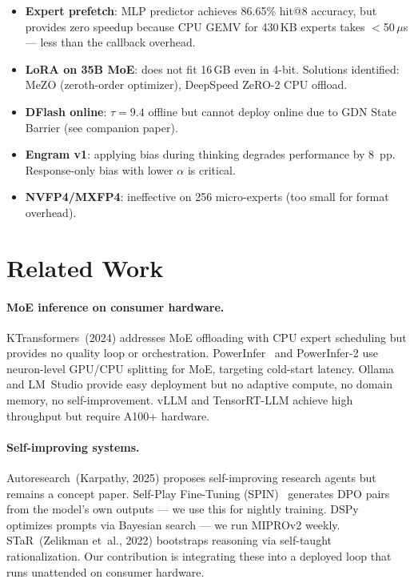 \documentclass[10pt,a4paper]{article}
\begin{document}
\begin{itemize}
  \item \textbf{Expert prefetch}: MLP predictor achieves 86.65\% hit@8 accuracy, but provides zero speedup because CPU GEMV for 430\,KB experts takes $<$50\,$\mu$s --- less than the callback overhead.
  \item \textbf{LoRA on 35B MoE}: does not fit 16\,GB even in 4-bit. Solutions identified: MeZO (zeroth-order optimizer), DeepSpeed ZeRO-2 CPU offload.
  \item \textbf{DFlash online}: $\tau{=}9.4$ offline but cannot deploy online due to GDN State Barrier (see companion paper).
  \item \textbf{Engram v1}: applying bias during thinking degrades performance by 8~pp. Response-only bias with lower $\alpha$ is critical.
  \item \textbf{NVFP4/MXFP4}: ineffective on 256 micro-experts (too small for format overhead).
\end{itemize}

\section{Related Work}

\paragraph{MoE inference on consumer hardware.}
KTransformers~(2024) addresses MoE offloading with CPU expert scheduling but provides no quality loop or orchestration.
PowerInfer~\cite{powerinfer2024} and PowerInfer-2 use neuron-level GPU/CPU splitting for MoE, targeting cold-start latency.
Ollama and LM~Studio provide easy deployment but no adaptive compute, no domain memory, no self-improvement.
vLLM and TensorRT-LLM achieve high throughput but require A100+ hardware.

\paragraph{Self-improving systems.}
Autoresearch~(Karpathy, 2025) proposes self-improving research agents but remains a concept paper.
Self-Play Fine-Tuning (SPIN)~\cite{spin2024} generates DPO pairs from the model's own outputs --- we use this for nightly training.
DSPy~\cite{dspy2024} optimizes prompts via Bayesian search --- we run MIPROv2 weekly.
STaR~(Zelikman et~al., 2022) bootstraps reasoning via self-taught rationalization.
Our contribution is integrating these into a deployed loop that runs unattended on consumer hardware.
\end{document}
